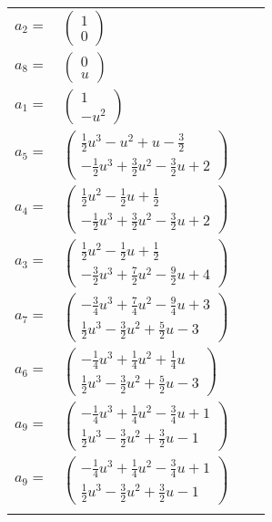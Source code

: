 \documentclass[1p]{elsarticle_modified}
\theoremstyle{definition}
\begin{document}
\begin{tabular}{m{7pt} m{180pt} m{7pt} m{180pt} }
\flushright $a_{2}=$&$\begin{pmatrix}1\\0\end{pmatrix}$ \\
\flushright $a_{8}=$&$\begin{pmatrix}0\\u\end{pmatrix}$ \\
\flushright $a_{1}=$&$\begin{pmatrix}1\\- u^2\end{pmatrix}$ \\
\flushright $a_{5}=$&$\begin{pmatrix}\frac{1}{2} u^3- u^2+u-\frac{3}{2}\\-\frac{1}{2} u^3+\frac{3}{2} u^2-\frac{3}{2} u+2\end{pmatrix}$ \\
\flushright $a_{4}=$&$\begin{pmatrix}\frac{1}{2} u^2-\frac{1}{2} u+\frac{1}{2}\\-\frac{1}{2} u^3+\frac{3}{2} u^2-\frac{3}{2} u+2\end{pmatrix}$ \\
\flushright $a_{3}=$&$\begin{pmatrix}\frac{1}{2} u^2-\frac{1}{2} u+\frac{1}{2}\\-\frac{3}{2} u^3+\frac{7}{2} u^2-\frac{9}{2} u+4\end{pmatrix}$ \\
\flushright $a_{7}=$&$\begin{pmatrix}-\frac{3}{4} u^3+\frac{7}{4} u^2-\frac{9}{4} u+3\\\frac{1}{2} u^3-\frac{3}{2} u^2+\frac{5}{2} u-3\end{pmatrix}$ \\
\flushright $a_{6}=$&$\begin{pmatrix}-\frac{1}{4} u^3+\frac{1}{4} u^2+\frac{1}{4} u\\\frac{1}{2} u^3-\frac{3}{2} u^2+\frac{5}{2} u-3\end{pmatrix}$ \\
\flushright $a_{9}=$&$\begin{pmatrix}-\frac{1}{4} u^3+\frac{1}{4} u^2-\frac{3}{4} u+1\\\frac{1}{2} u^3-\frac{3}{2} u^2+\frac{3}{2} u-1\end{pmatrix}$\\ \flushright $a_{9}=$&$\begin{pmatrix}-\frac{1}{4} u^3+\frac{1}{4} u^2-\frac{3}{4} u+1\\\frac{1}{2} u^3-\frac{3}{2} u^2+\frac{3}{2} u-1\end{pmatrix}$\\&\end{tabular}
\end{document}

